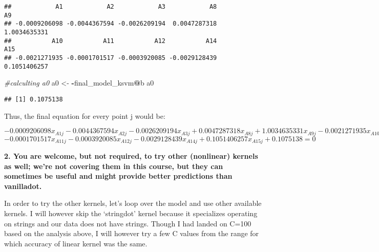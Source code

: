 \documentclass[
]{article}
\newenvironment{Shaded}{\begin{snugshade}}{\end{snugshade}}
\newcommand{\CommentTok}[1]{\textcolor[rgb]{0.56,0.35,0.01}{\textit{#1}}}
\newcommand{\NormalTok}[1]{#1}
\newcommand{\OperatorTok}[1]{\textcolor[rgb]{0.81,0.36,0.00}{\textbf{#1}}}
\newcommand{\StringTok}[1]{\textcolor[rgb]{0.31,0.60,0.02}{#1}}
\begin{document}
\begin{verbatim}
##            A1            A2            A3            A8            A9 
## -0.0009206098 -0.0044367594 -0.0026209194  0.0047287318  1.0034635331 
##           A10           A11           A12           A14           A15 
## -0.0021271935 -0.0001701517 -0.0003920085 -0.0029128439  0.1051406257
\end{verbatim}

\begin{Shaded}
\begin{Highlighting}[]
\CommentTok{#calculting a0}
\NormalTok{a0 <-}\StringTok{ }\OperatorTok{-}\NormalTok{final_model_ksvm}\OperatorTok{@}\NormalTok{b}
\NormalTok{a0}
\end{Highlighting}
\end{Shaded}

\begin{verbatim}
## [1] 0.1075138
\end{verbatim}

Thus, the final equation for every point j would be:

\(-0.0009206098x_{A1j} - 0.0044367594x_{A2j} - 0.0026209194x_{A3j} + 0.0047287318x_{A8j} + 1.0034635331x_{A9j} - 0.0021271935x_{A10j}\)
\(- 0.0001701517x_{A11j} - 0.0003920085x_{A12j} - 0.0029128439x_{A14j} + 0.1051406257x_{A15j} + 0.1075138 = 0\)

\textbf{2. You are welcome, but not required, to try other (nonlinear)
kernels as well; we're not covering them in this course, but they can
sometimes be useful and might provide better predictions than
vanilladot.}

In order to try the other kernels, let's loop over the model and use
other available kernels. I will however skip the `stringdot' kernel
because it specializes operating on strings and our data does not have
strings. Though I had landed on C=100 based on the analysis above, I
will however try a few C values from the range for which accuracy of
linear kernel was the same.
\end{document}
